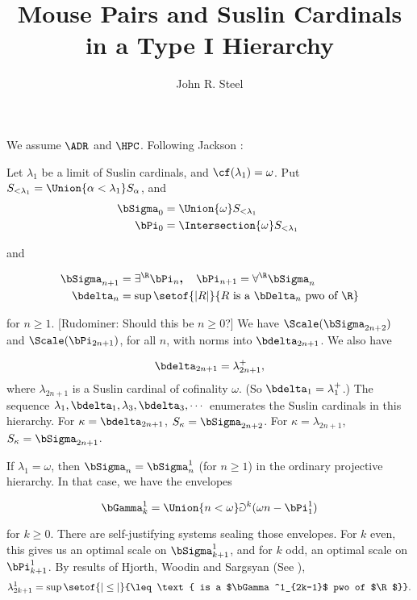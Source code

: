 \documentclass[oneside,12pt]{amsart}
\begin{document}
\title{Mouse Pairs and Suslin Cardinals in a Type I Hierarchy}
\author{John R. Steel}

\maketitle

\tableofcontents

We assume $\ADR$ and $\HPC$. Following Jackson \cite{Jackson1}:

Let $\lambda_1$ be a limit of Suslin cardinals, and $\cf(\lambda_1)=\omega$.
Put $S_{<\lambda_1} =\Union{\alpha<\lambda_1} S_{\alpha}$, and
\begin{align*}
\bSigma_0 &= \Union{\omega} S_{<\lambda_1} \\
\bPi_0 &= \Intersection{\omega} S_{<\lambda_1} \
\end{align*}

and

\begin{align*}
\bSigma_{n+1} &= \exists^{\R}\bPi_n \textbf{,\quad}
\bPi_{n+1} = \forall^{\R}\bSigma_n \\
\bdelta_n&=\sup\setof{|R|}{R\text{ is a }\bDelta_n\text{ pwo of } \R}
\end{align*}

for $n\geq 1$. [Rudominer: Should this be $n\geq 0$?]
We have $\Scale(\bSigma_{2n+2})$ and $\Scale(\bPi_{2n+1})$,
for all $n$, with norms into $\bdelta_{2n+1}$. We also have

$$ \bdelta_{2n+1} = \lambda_{2n+1}^+,$$
where $\lambda_{2n+1}$ is a Suslin cardinal of cofinality $\omega$.
(So $\bdelta_1=\lambda_1^+$.) The sequence $\lambda_1,\bdelta_1,\lambda_3,\bdelta_3,\cdots$
enumerates the Suslin cardinals in this hierarchy. For $\kappa=\bdelta_{2n+1}$,
$S_{\kappa}=\bSigma_{2n+2}$. For $\kappa=\lambda_{2n+1}$,
$S_{\kappa}=\bSigma_{2n+1}$.

If $\lambda_1=\omega$, then $\bSigma_n = \bSigma^1_n$ (for $n\geq 1$) in  the
ordinary projective hierarchy. In that case, we have the envelopes

$$
\bGamma^1_{k} = \Union{n<\omega} \Game^{k}(\omega n - \bPi^1_1)
$$

for $k\geq0$. There are self-justifying systems sealing those envelopes. For $k$ even, this gives us an optimal scale on $\bSigma^1_{k+1}$, and for $k$ odd, an optimal scale on $\bPi^1_{k+1}$. By results of
Hjorth, Woodin and Sargsyan (See \cite{Sargsyan1}),
$$
\lambda^1_{2k+1} = \sup\setof{|\leq|}{\leq\text{ is a $\bGamma^1_{2k-1}$ pwo of $\R$}}.
$$
\end{document}
